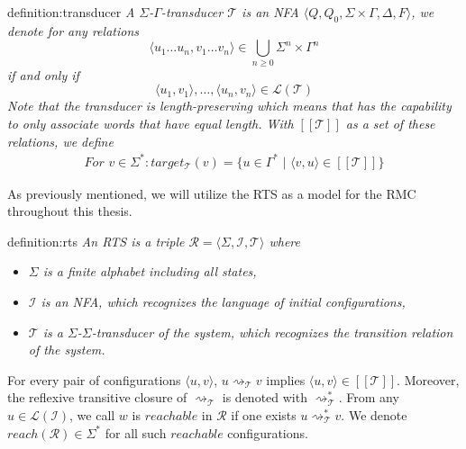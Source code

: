 \newpage
\begin{theo}[Transducer]{definition:transducer}
    \textit{
        A $\Sigma$-$\Gamma$-\textit{transducer} $\mathcal{T}$ is an \textit{NFA} 
        $\langle Q, Q_0, \Sigma \times \Gamma, \Delta, F \rangle$,
        we denote for any relations 
        \begin{equation*}
          \langle u_1 \dots u_n, v_1 \dots v_n \rangle \in \bigcup_{n \geq 0} \Sigma^{n} \times \Gamma^{n} 
        \end{equation*}
        if and only if 
        \begin{equation*}
            \langle u_1, v_1 \rangle, \dots, \langle u_n, v_n \rangle \in \mathcal{L}(\mathcal{T})
        \end{equation*}
        Note that the transducer is length-preserving which means that has the capability to only associate words that have equal length.
        With $[[\mathcal{T}]]$ as a set of these relations, we define
        \begin{align*} 
            For \,\, v \in \Sigma^*: target_{\mathcal{T}}(v) = \lbrace u \in \Gamma^*\,\, | \,\, \langle v,u \rangle \in [[\mathcal{T}]] \rbrace 
        \end{align*}
    }
\end{theo}

As previously mentioned, we will utilize the RTS as a model for the RMC throughout this thesis.
\begin{theo}{definition:rts}
    \textit{
    An RTS is a triple $\mathcal{R} = \langle \Sigma, \mathcal{I}, \mathcal{T} \rangle$ where
    }
    \begin{itemize}
        \item \textit{$\Sigma$ is a finite alphabet including all states,}
        \item \textit{$\mathcal{I}$ is an NFA, which recognizes the language of initial configurations,}
        \item \textit{$\mathcal{T}$ is a $\Sigma$-$\Sigma$-\textit{transducer} of the system, which recognizes the transition relation of the system.}
      \end{itemize}
\end{theo}

For every pair of configurations $\langle u, v \rangle$, $u \rightsquigarrow_\mathcal{T} v$ implies $\langle u, v \rangle \in [[\mathcal{T}]]$.
Moreover, the reflexive transitive closure of $\rightsquigarrow_\mathcal{T}$ is denoted with $\rightsquigarrow_\mathcal{T}^{*}$.
From any $u \in \mathcal{L}(\mathcal{I})$, we call $w$ is $reachable$ in $\mathcal{R}$ if one
exists $u \rightsquigarrow_\mathcal{T}^{*} v$. We denote $reach(\mathcal{R}) \in \Sigma^*$ for all such $reachable$ configurations.

